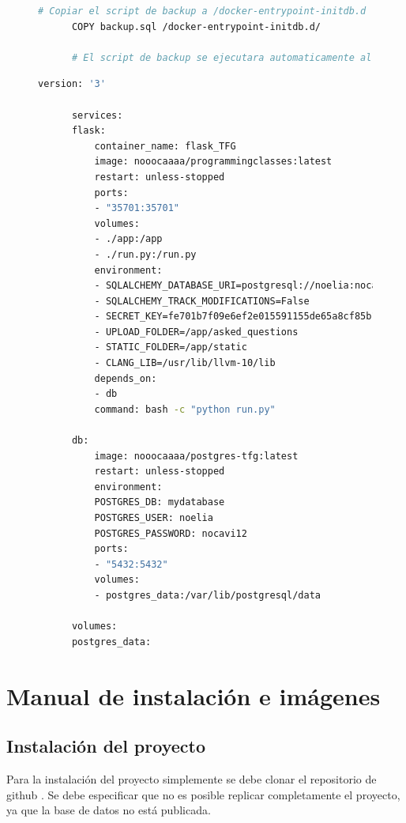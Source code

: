 \begin{appendices}
\begin{figure}[H]
\begin{lstlisting}[language=bash, caption={Dockerfile para la creación de la imagen de la base de datos}, label=fig:dockerfilebbdd]
      # Copiar el script de backup a /docker-entrypoint-initdb.d
      COPY backup.sql /docker-entrypoint-initdb.d/
      
      # El script de backup se ejecutara automaticamente al iniciar el contenedor
    \end{lstlisting}
  \end{figure}

  \begin{figure}[H]
    \centering
    \begin{lstlisting}[language=bash, caption={Fichero Podman-compose para desplegar la bbdd y la app en el servidor}, label=fig:podmancompose]
      version: '3'
  
      services:
      flask:
          container_name: flask_TFG
          image: nooocaaaa/programmingclasses:latest
          restart: unless-stopped
          ports:
          - "35701:35701"
          volumes:
          - ./app:/app
          - ./run.py:/run.py
          environment:
          - SQLALCHEMY_DATABASE_URI=postgresql://noelia:nocavi12@db:5432/mydatabase
          - SQLALCHEMY_TRACK_MODIFICATIONS=False
          - SECRET_KEY=fe701b7f09e6ef2e015591155de65a8cf85b160e6a75490a
          - UPLOAD_FOLDER=/app/asked_questions
          - STATIC_FOLDER=/app/static
          - CLANG_LIB=/usr/lib/llvm-10/lib
          depends_on:
          - db
          command: bash -c "python run.py"
  
      db:
          image: nooocaaaa/postgres-tfg:latest
          restart: unless-stopped
          environment:
          POSTGRES_DB: mydatabase
          POSTGRES_USER: noelia
          POSTGRES_PASSWORD: nocavi12
          ports:
          - "5432:5432"
          volumes:
          - postgres_data:/var/lib/postgresql/data
  
      volumes:
      postgres_data:
    \end{lstlisting}
  \end{figure}

\chapter{Manual de instalación e imágenes} \label{imagenessistema}

\section {Instalación del proyecto}

Para la instalación del proyecto simplemente se debe clonar el repositorio de github \cite{personalgithub}. Se debe especificar que no es posible replicar completamente el proyecto, ya que la base de datos no está publicada. 


\end{appendices}
